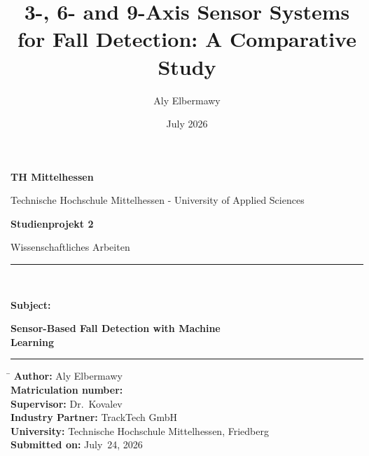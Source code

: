 \documentclass[11pt,a4paper,oneside]{report}
\title{3-, 6- and 9-Axis Sensor Systems for Fall Detection: A Comparative Study}
\author{Aly Elbermawy}
\date{July 2026}
\begin{document}
\begin{titlepage}
\begin{center}

\vspace*{1cm}
{\LARGE\bfseries TH Mittelhessen\par}
\vspace{0.2cm}
{\small Technische Hochschule Mittelhessen - University of Applied Sciences\par}

\vspace{2.5cm}
{\Large\bfseries Studienprojekt 2\par}
\vspace{0.4cm}
{\large Wissenschaftliches Arbeiten\par}

\vspace{2cm}
\rule{0.7\textwidth}{0.4pt}\\[0.4cm]
{\Large\bfseries Subject:\par}
\vspace{0.3cm}
{\Large\bfseries Sensor-Based Fall Detection with Machine\\Learning}\\[0.4cm]
\rule{0.7\textwidth}{0.4pt}

\vspace{2cm}
\begin{tabbing}
\hspace{4.5cm}\= \kill
\textbf{Author:}         \> Aly Elbermawy \\
\textbf{Matriculation number:}  \\[0.4cm]
\textbf{Supervisor:}     \> Dr.\ Kovalev \\
\textbf{Industry Partner:} \> TrackTech GmbH \\[0.4cm]
\textbf{University:}     \> Technische Hochschule Mittelhessen, Friedberg \\[0.4cm]
\textbf{Submitted on:}   \> July~24, 2026
\end{tabbing}

\end{center}
\end{titlepage}

\thispagestyle{empty}
\vspace*{2cm}
\end{document}
